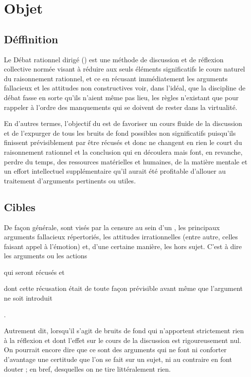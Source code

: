 \section{Objet}

\subsection{Déffinition}
Le Débat rationnel dirigé (\mainabbr{}) est une méthode de discussion et de réflexion collective normée visant à réduire aux seuls éléments significatifs le cours naturel du raisonnement rationnel, et ce en récusant immédiatement les arguments fallacieux et les attitudes non constructives voir, dans l’idéal, que la discipline de débat fasse en sorte qu’ils n’aient même pas lieu, les règles n’existant que pour rappeler à l’ordre des manquements qui se doivent de rester dans la virtualité.

En d’autres termes, l’objectif du \mainabbr{} est de favoriser un cours fluide de la discussion et de l’expurger de tous les bruits de fond possibles non significatifs puisqu’ils finissent prévisiblement par être récusés et donc ne changent en rien le court du raisonnement rationnel et la conclusion qui en découlera mais font, en revanche, perdre du temps, des ressources matérielles et humaines, de la matière mentale et un effort intellectuel supplémentaire qu’il aurait été profitable d’allouer au traitement d’arguments pertinents ou utiles.

\subsection{Cibles}
De façon générale, sont visés par la censure au sein d’un \mainabbr{}, les principaux arguments fallacieux répertoriés, les attitudes irrationnelles (entre autre, celles faisant appel à l’émotion) et, d’une certaine manière, les hors sujet. C’est à dire les arguments ou les actions
\begin{SRlist}
	\item qui seront récusés
	et
	\item dont cette récusation était de toute façon prévisible avant même que l’argument ne soit introduit%
\end{SRlist}%
.

Autrement dit, lorsqu’il s’agit de bruits de fond qui n’apportent strictement rien à la réflexion et dont l’effet sur le cours de la discussion est rigoureusement nul. On pourrait encore dire que ce sont des arguments qui ne font ni conforter d’avantage une certitude que l’on se fait sur un sujet, ni au contraire en font douter ; en bref, desquelles on ne tire littéralement rien.

